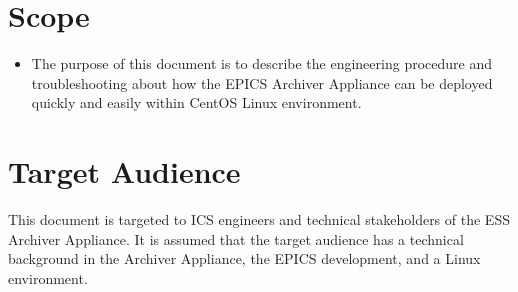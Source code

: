\documentclass[11pt
  , a4paper
  , article
  , oneside
  , showtrims
]{memoir}
\begin{document}
\section{Scope}
\begin{itemize}
\item The purpose of this document is to describe the engineering procedure and troubleshooting about how the EPICS Archiver Appliance can be deployed quickly and easily within CentOS Linux environment.
\end{itemize}

\section{Target Audience}
This document is targeted to ICS engineers and technical stakeholders of the ESS Archiver Appliance. It is assumed that the target audience has a technical background in the Archiver Appliance, the EPICS development, and a Linux environment.

\end{document}

